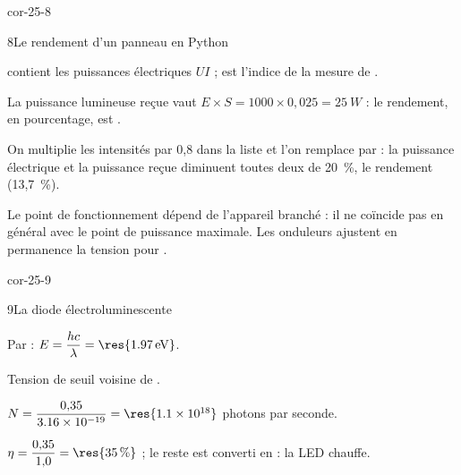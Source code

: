 \begin{blocLivre}{cor-25-8}
\begin{corrige}{8}{Le rendement d'un panneau en Python}
\begin{questions}
\item {} contient les puissances électriques $UI$ ;  est l'indice de la mesure de .
\item La puissance lumineuse reçue vaut $E\times S=1000\times0{,}025=\qty{25}{W}$ : le rendement, en pourcentage, est
.
\item On multiplie les intensités par 0,8 dans la liste  et l'on remplace  par  : la puissance
électrique et la puissance reçue diminuent toutes deux de 20~\%, le rendement  (13,7~\%).
\item Le point de fonctionnement dépend de l'appareil branché : il ne coïncide pas en général avec le point de puissance
maximale. Les onduleurs ajustent en permanence la tension pour .
\end{questions}
\end{corrige}
\end{blocLivre}
\begin{blocLivre}{cor-25-9}
\begin{corrige}{9}{La diode électroluminescente}
\begin{questions}
\item Par  : $E=\dfrac{hc}{\lambda}=\res{\qty{1,97}{eV}}$.
\item Tension de seuil voisine de .
\item $N=\dfrac{0{,}35}{\num{3.16e-19}}=\res{\num{1.1e18}}$ photons par seconde.
\item $\eta=\dfrac{0{,}35}{1{,}0}=\res{\qty{35}{\percent}}$ ; le reste est converti en  : la LED chauffe.
\end{questions}
\end{corrige}
\end{blocLivre}
